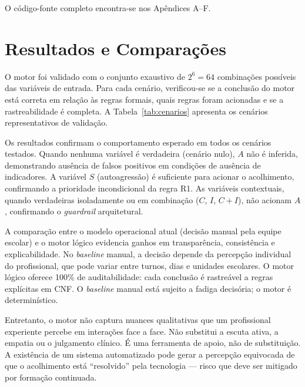 \documentclass[
    12pt,
    openright,
    oneside,
    a4paper,
    english,
    brazil
]{abntex2}
\begin{document}
O código-fonte completo encontra-se nos Apêndices A--F.

\chapter{Resultados e Comparações}

O motor foi validado com o conjunto exaustivo de $2^6 = 64$ combinações possíveis das variáveis de entrada. Para cada cenário, verificou-se se a conclusão do motor está correta em relação às regras formais, quais regras foram acionadas e se a rastreabilidade é completa. A Tabela~\ref{tab:cenarios} apresenta os cenários representativos de validação.

Os resultados confirmam o comportamento esperado em todos os cenários testados. Quando nenhuma variável é verdadeira (cenário nulo), $A$ não é inferida, demonstrando ausência de falsos positivos em condições de ausência de indicadores. A variável $S$ (autoagressão) é suficiente para acionar o acolhimento, confirmando a prioridade incondicional da regra R1. As variáveis contextuais, quando verdadeiras isoladamente ou em combinação ($C$, $I$, $C+I$), não acionam $A$, confirmando o \textit{guardrail} arquitetural.

A comparação entre o modelo operacional atual (decisão manual pela equipe escolar) e o motor lógico evidencia ganhos em transparência, consistência e explicabilidade. No \textit{baseline} manual, a decisão depende da percepção individual do profissional, que pode variar entre turnos, dias e unidades escolares. O motor lógico oferece 100\% de auditabilidade: cada conclusão é rastreável a regras explícitas em CNF. O \textit{baseline} manual está sujeito a fadiga decisória; o motor é determinístico.

Entretanto, o motor não captura nuances qualitativas que um profissional experiente percebe em interações face a face. Não substitui a escuta ativa, a empatia ou o julgamento clínico. É uma ferramenta de apoio, não de substituição. A existência de um sistema automatizado pode gerar a percepção equivocada de que o acolhimento está ``resolvido'' pela tecnologia --- risco que deve ser mitigado por formação continuada.


\end{document}

